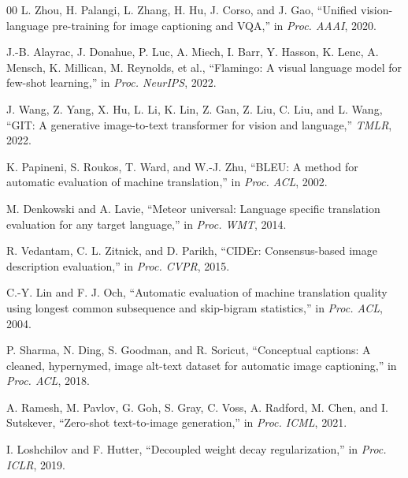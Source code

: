 \documentclass[conference]{IEEEtran}
\begin{document}
\begin{thebibliography}{00}
L. Zhou, H. Palangi, L. Zhang, H. Hu, J. Corso, and J. Gao, ``Unified vision-language pre-training for image captioning and VQA,'' in \textit{Proc. AAAI}, 2020.

J.-B. Alayrac, J. Donahue, P. Luc, A. Miech, I. Barr, Y. Hasson, K. Lenc, A. Mensch, K. Millican, M. Reynolds, et al., ``Flamingo: A visual language model for few-shot learning,'' in \textit{Proc. NeurIPS}, 2022.

J. Wang, Z. Yang, X. Hu, L. Li, K. Lin, Z. Gan, Z. Liu, C. Liu, and L. Wang, ``GIT: A generative image-to-text transformer for vision and language,'' \textit{TMLR}, 2022.

K. Papineni, S. Roukos, T. Ward, and W.-J. Zhu, ``BLEU: A method for automatic evaluation of machine translation,'' in \textit{Proc. ACL}, 2002.

M. Denkowski and A. Lavie, ``Meteor universal: Language specific translation evaluation for any target language,'' in \textit{Proc. WMT}, 2014.

R. Vedantam, C. L. Zitnick, and D. Parikh, ``CIDEr: Consensus-based image description evaluation,'' in \textit{Proc. CVPR}, 2015.

C.-Y. Lin and F. J. Och, ``Automatic evaluation of machine translation quality using longest common subsequence and skip-bigram statistics,'' in \textit{Proc. ACL}, 2004.

P. Sharma, N. Ding, S. Goodman, and R. Soricut, ``Conceptual captions: A cleaned, hypernymed, image alt-text dataset for automatic image captioning,'' in \textit{Proc. ACL}, 2018.

A. Ramesh, M. Pavlov, G. Goh, S. Gray, C. Voss, A. Radford, M. Chen, and I. Sutskever, ``Zero-shot text-to-image generation,'' in \textit{Proc. ICML}, 2021.

I. Loshchilov and F. Hutter, ``Decoupled weight decay regularization,'' in \textit{Proc. ICLR}, 2019.

\end{thebibliography}
\end{document}
